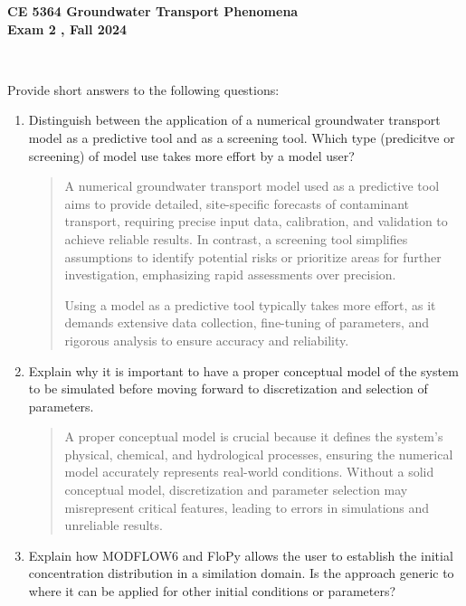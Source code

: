 \documentclass[12pt]{article}
\begin{document}
\begingroup
\begin{centering}
\textbf{CE 5364 Groundwater Transport Phenomena } \\
\textbf{Exam 2 , Fall 2024}\\
\end{centering}
~\\
\endgroup

Provide short answers to the following questions:
\begin{enumerate}

\item Distinguish between the application of a numerical groundwater transport model as a predictive tool and as a screening tool.  Which type (predicitve or screening) of model use takes more effort by a model user?

\begin{quote}
A numerical groundwater transport model used as a predictive tool aims to provide detailed, site-specific forecasts of contaminant transport, requiring precise input data, calibration, and validation to achieve reliable results. In contrast, a screening tool simplifies assumptions to identify potential risks or prioritize areas for further investigation, emphasizing rapid assessments over precision. 

Using a model as a predictive tool typically takes more effort, as it demands extensive data collection, fine-tuning of parameters, and rigorous analysis to ensure accuracy and reliability.
\end{quote}
\clearpage

\item Explain why it is important to have a proper conceptual model of the system to be simulated before moving forward to discretization and selection of parameters.

\begin{quote}
A proper conceptual model is crucial because it defines the system's physical, chemical, and hydrological processes, ensuring the numerical model accurately represents real-world conditions. Without a solid conceptual model, discretization and parameter selection may misrepresent critical features, leading to errors in simulations and unreliable results.
\end{quote}
\clearpage

\item  Explain how MODFLOW6 and FloPy allows the user to establish the initial concentration distribution in a similation domain.  Is the approach generic to where it can be applied for other initial conditions or parameters?


\end{enumerate}
\end{document}
